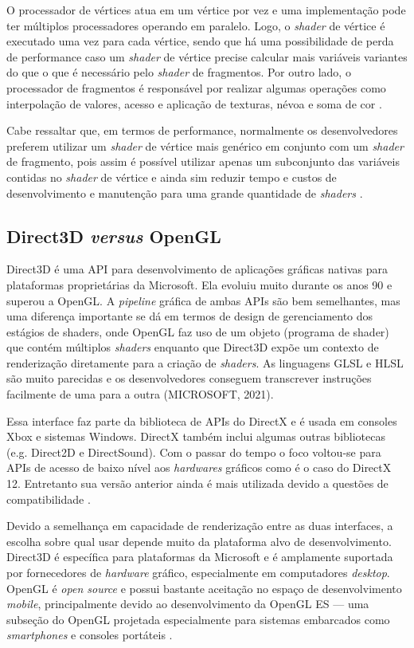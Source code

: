 O processador de vértices atua em um vértice por vez e uma implementação pode ter múltiplos processadores operando em paralelo. Logo, o \textit{shader} de vértice é executado uma vez para cada vértice, sendo que há uma possibilidade de perda de performance caso um \textit{shader} de vértice precise calcular mais variáveis variantes do que o que é necessário pelo \textit{shader} de fragmentos. Por outro lado, o processador de fragmentos é responsável por realizar algumas operações como interpolação de valores, acesso e aplicação de texturas, névoa e soma de cor \cite{GLSLBook}. 

Cabe ressaltar que, em termos de performance, normalmente os desenvolvedores preferem utilizar um \textit{shader} de vértice mais genérico em conjunto com um \textit{shader} de fragmento, pois assim é possível utilizar apenas um subconjunto das variáveis contidas no \textit{shader} de vértice e ainda sim reduzir tempo e custos de desenvolvimento e manutenção para uma grande quantidade de \textit{shaders} \cite{GLSLBook}.

\subsection{Direct3D \textit{versus} OpenGL}
\label{sec:direct-versus-opengl}

Direct3D é uma API para desenvolvimento de aplicações gráficas nativas para plataformas proprietárias da Microsoft. Ela evoluiu muito durante os anos 90 e superou a OpenGL. A \textit{pipeline} gráfica de ambas APIs são bem semelhantes, mas uma diferença importante se dá em termos de design de gerenciamento dos estágios de shaders, onde OpenGL faz uso de um objeto (programa de shader) que contém múltiplos \textit{shaders} enquanto que Direct3D expõe um contexto de renderização diretamente para a criação de \textit{shaders}. As linguagens GLSL e HLSL são muito parecidas e os desenvolvedores conseguem transcrever instruções facilmente de uma para a outra (MICROSOFT, 2021)\nocite{Direct3D}.

Essa interface faz parte da biblioteca de APIs do DirectX e é usada em consoles Xbox e sistemas Windows. DirectX também inclui algumas outras bibliotecas (e.g. Direct2D e DirectSound). Com o passar do tempo o foco voltou-se para APIs de acesso de baixo nível aos \textit{hardwares} gráficos como é o caso do DirectX 12. Entretanto sua versão anterior ainda é mais utilizada devido a questões de compatibilidade \cite{hasu2018modern}.

Devido a semelhança em capacidade de renderização entre as duas interfaces, a escolha sobre qual usar depende muito da plataforma alvo de desenvolvimento. Direct3D é específica para plataformas da Microsoft e é amplamente suportada por fornecedores de \textit{hardware} gráfico, especialmente em computadores \textit{desktop}. OpenGL é \textit{open source} e possui bastante aceitação no espaço de desenvolvimento \textit{mobile}, principalmente devido ao desenvolvimento da OpenGL ES --- uma subseção do OpenGL projetada especialmente para sistemas embarcados como \textit{smartphones} e consoles portáteis \cite{HLSLBook}.

